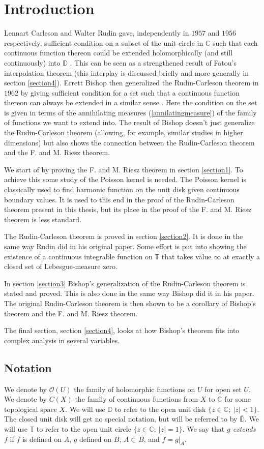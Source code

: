 \documentclass[a4paper,12pt,twoside,BCOR=10mm]{scrbook}
\theoremstyle{definition}
\theoremstyle{definition}
\theoremstyle{definition}
\begin{document}
\chapter{Introduction}
Lennart Carleson and Walter Rudin gave, independently in $1957$ and $1956$ respectively, sufficient condition on a subset of the unit circle in $\mathbb{C}$ such that each continuous function thereon could be extended holomorphically (and still continuously) into $\mathbb{D}$ \citep{rudin, carleson}.
This can be seen as a strengthened result of Fatou's interpolation theorem \citep{fatou} (this interplay is discussed briefly and more generally in section \ref{section4}).
Errett Bishop then generalized the Rudin-Carleson theorem in $1962$ by giving sufficient condition for a set such that a continuous function thereon can always be extended in a similar sense \citep{bishop}.
Here the condition on the set is given in terms of the annihilating measures (\ref{annilatingmeasure}) of the family of functions we want to extend into.
The result of Bishop doesn't just generalize the Rudin-Carleson theorem (allowing, for example, similar studies in higher dimensions) but also shows the connection between the Rudin-Carleson theorem and the F. and M. Riesz theorem. %

We start of by proving the F. and M. Riesz theorem in section \ref{section1}.
To achieve this some study of the Poisson kernel is needed.
The Poisson kernel is classically used to find harmonic function on the unit disk given continuous boundary values.
It is used to this end in the proof of the Rudin-Carleson theorem present in this thesis, but its place in the proof of the F. and M. Riesz theorem is less standard.

The Rudin-Carleson theorem is proved in section \ref{section2}.
It is done in the same way Rudin did in his original paper.
Some effort is put into showing the existence of a continuous integrable function on $\mathbb{T}$ that takes value $\infty$ at exactly a closed set of Lebesgue-measure zero.

In section \ref{section3} Bishop's generalization of the Rudin-Carleson theorem is stated and proved.
This is also done in the same way Bishop did it in his paper.
The original Rudin-Carleson theorem is then shown to be a corollary of Bishop's theorem and the F. and M. Riesz theorem.

The final section, section \ref{section4}, looks at how Bishop's theorem fits into complex analysis in several variables.
\section{Notation}
We denote by $\mathcal{O}(U)$ the family of holomorphic functions on $U$ for open set $U$.
We denote by $C(X)$ the family of continuous functions from $X$ to $\mathbb{C}$ for some topological space $X$.
We will use $\mathbb{D}$ to refer to the open unit disk $\{z \in \mathbb{C};\ |z| < 1\}$.
The closed unit disk will get no special notation, but will be referred to by $\overline{\mathbb{D}}$.
We will use $\mathbb{T}$ to refer to the open unit circle $\{z \in \mathbb{C};\ |z| = 1\}$.
We say that \emph{$g$ extends $f$} if
	$f$ is defined on $A$,
	$g$ defined on $B$,
	$A \subset B$,
	and $f = g|_A$.
\end{document}
